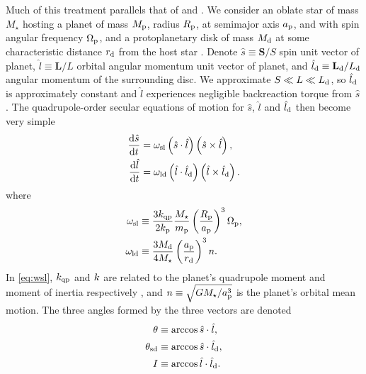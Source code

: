 \documentclass[
        fleqn,
        usenatbib,
        referee,
    ]{mnras}
\newcommand*{\rd}[2]{\frac{\mathrm{d}#1}{\mathrm{d}#2}}
\newcommand*{\bm}[1]{\boldsymbol{\mathbf{#1}}}
\newcommand*{\p}[1]{\left(#1\right)}
\begin{document}
Much of this treatment parallels that of \citet{anderson2018teeter} and
\citet{millholland_disk}. We consider an oblate star of mass $M_\star$ hosting a
planet of mass $M_{\rm p}$, radius $R_{\rm p}$, at semimajor axis $a_{\rm p}$,
and with spin angular frequency $\Omega_{\rm p}$, and a protoplanetary disk of
mass $M_{\rm d}$ at some characteristic distance $r_{\rm d}$ from the host star
\citep[see][for a power-law disk profile]{millholland_disk}. Denote $\hat{s}
\equiv \bm{S} / S$ spin unit vector of planet, $\hat{l} \equiv \bm{L} / L$
orbital angular momentum unit vector of planet, and $\hat{l}_{\rm d} \equiv
\bm{L}_{\rm d} / L_{\rm d}$ angular momentum of the surrounding disc. We
approximate $S \ll L \ll L_{\rm d}$, so $\hat{l}_{\rm d}$ is approximately
constant and $\hat{l}$ experiences negligible backreaction torque from
$\hat{s}$. The quadrupole-order secular equations of motion for $\hat{s}$,
$\hat{l}$ and $\hat{l}_{\rm d}$ then become very simple
\begin{align}
    \rd{\hat{s}}{t} &= \omega_{\rm sl} \p{\hat{s} \cdot \hat{l}}
        \p{\hat{s} \times \hat{l}},\label{eq:dsdt}\\
    \rd{\hat{l}}{t} &= \omega_{\rm ld}\p{\hat{l} \cdot \hat{l}_{\rm d}}
        \p{\hat{l} \times \hat{l}_{\rm d}}\label{eq:dldt}.
\end{align}
where
\begin{align}
    \omega_{\rm sl} &\equiv \frac{3k_{\rm qp}}{2k_{\rm p}} \frac{M_\star}{m_{\rm
        p}} \p{\frac{R_{\rm p}}{a_{\rm p}}}^3 \Omega_{\rm p},\label{eq:wsl}\\
    \omega_{\rm ld} &\equiv \frac{3M_{\rm d}}{4M_\star}\p{\frac{a_{\rm
        p}}{r_{\rm d}}}^3 n .\label{eq:wld}
\end{align}
In \autoref{eq:wsl}, $k_{\rm qp}$ and $k_{\rm }$ are related to the planet's
quadrupole moment and moment of inertia respectively \citep[see][]{lai2018}, and
$n \equiv \sqrt{GM_\star/a_{\rm p}^3}$ is the planet's orbital mean motion. The
three angles formed by the three vectors are denoted
\begin{align}
    \theta &\equiv \arccos \hat{s} \cdot \hat{l},\\
    \theta_{\rm sd} &\equiv \arccos \hat{s} \cdot \hat{l}_{\rm d},\\
    I &\equiv \arccos \hat{l} \cdot \hat{l}_{\rm d}.
\end{align}
\end{document}
